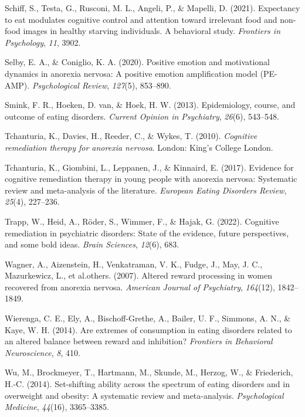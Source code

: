 \documentclass[
  man,floatsintext]{apa6}
\newlength{\cslhangindent}
\newlength{\cslentryspacingunit} %
\newenvironment{CSLReferences}[2] %
 {%
  \setlength{\parindent}{0pt}
  \ifodd #1
  \let\oldpar\par
  \def\par{\hangindent=\cslhangindent\oldpar}
  \fi
  \setlength{\parskip}{#2\cslentryspacingunit}
 }%
 {}
\begin{document}
\begin{CSLReferences}{1}{0}
\leavevmode{}%
Schiff, S., Testa, G., Rusconi, M. L., Angeli, P., \& Mapelli, D. (2021). Expectancy to eat modulates cognitive control and attention toward irrelevant food and non-food images in healthy starving individuals. A behavioral study. \emph{Frontiers in Psychology}, \emph{11}, 3902.

\leavevmode{}%
Selby, E. A., \& Coniglio, K. A. (2020). Positive emotion and motivational dynamics in anorexia nervosa: A positive emotion amplification model (PE-AMP). \emph{Psychological Review}, \emph{127}(5), 853--890.

\leavevmode{}%
Smink, F. R., Hoeken, D. van, \& Hoek, H. W. (2013). Epidemiology, course, and outcome of eating disorders. \emph{Current Opinion in Psychiatry}, \emph{26}(6), 543--548.

\leavevmode{}%
Tchanturia, K., Davies, H., Reeder, C., \& Wykes, T. (2010). \emph{Cognitive remediation therapy for anorexia nervosa}. London: King's College London.

\leavevmode{}%
Tchanturia, K., Giombini, L., Leppanen, J., \& Kinnaird, E. (2017). Evidence for cognitive remediation therapy in young people with anorexia nervosa: Systematic review and meta-analysis of the literature. \emph{European Eating Disorders Review}, \emph{25}(4), 227--236.

\leavevmode{}%
Trapp, W., Heid, A., Röder, S., Wimmer, F., \& Hajak, G. (2022). Cognitive remediation in psychiatric disorders: State of the evidence, future perspectives, and some bold ideas. \emph{Brain Sciences}, \emph{12}(6), 683.

\leavevmode{}%
Wagner, A., Aizenstein, H., Venkatraman, V. K., Fudge, J., May, J. C., Mazurkewicz, L., et al.others. (2007). Altered reward processing in women recovered from anorexia nervosa. \emph{American Journal of Psychiatry}, \emph{164}(12), 1842--1849.

\leavevmode{}%
Wierenga, C. E., Ely, A., Bischoff-Grethe, A., Bailer, U. F., Simmons, A. N., \& Kaye, W. H. (2014). Are extremes of consumption in eating disorders related to an altered balance between reward and inhibition? \emph{Frontiers in Behavioral Neuroscience}, \emph{8}, 410.

\leavevmode{}%
Wu, M., Brockmeyer, T., Hartmann, M., Skunde, M., Herzog, W., \& Friederich, H.-C. (2014). Set-shifting ability across the spectrum of eating disorders and in overweight and obesity: A systematic review and meta-analysis. \emph{Psychological Medicine}, \emph{44}(16), 3365--3385.

\end{CSLReferences}
\end{document}
